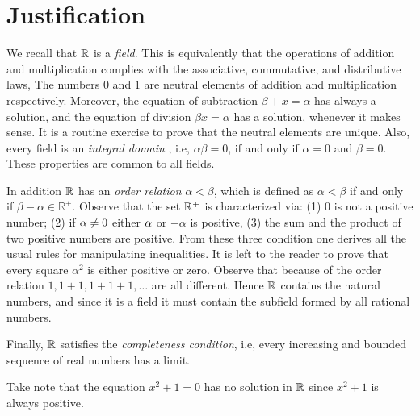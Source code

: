  
 
 \section{Justification}
 We recall that $ \mathbb{R} $ is a \emph{field}. This is equivalently that the operations of addition and multiplication complies with the associative, commutative, and distributive laws, The numbers $0$ and $1$ are neutral elements of addition and multiplication respectively. Moreover, the equation of subtraction $ \beta + x = \alpha $ has always a solution, and the equation of division $ \beta x = \alpha $ has a solution, whenever it makes sense. It is a routine exercise to prove that the neutral elements are unique. Also, every field is an \emph{integral domain }, i.e, $ \alpha \beta = 0 $, if and only if $ \alpha = 0$ and $ \beta = 0 $. These properties are common to all fields.
 
 In addition $\mathbb{R}$ has an \emph{order relation} $ \alpha < \beta $, which is defined as $ \alpha < \beta $ if and only if $ \beta - \alpha \in \mathbb{R}^+ $. Observe that the set $ \mathbb{R}^+ $ is characterized via: (1) 0 is not a positive number; (2) if $ \alpha \neq 0 $ either $ \alpha $ or $ -\alpha $ is positive, (3) the sum and the product of two positive numbers are positive. From these three condition one derives all the usual rules for manipulating inequalities. It is left to the reader to prove that every square $ \alpha^2 $ is either positive or zero. Observe that because of the order relation $1, 1+1, 1+1+1, \ldots $ are all different. Hence $ \mathbb{R} $ contains the natural numbers, and since it is a field it must contain the subfield formed by all rational numbers.
 
 Finally, $ \mathbb{R}$ satisfies the \emph{completeness condition}, i.e, every increasing and bounded sequence of real numbers has a limit.
 
 Take note that the equation $ x^2 + 1 =0 $ has no solution in $ \mathbb{R} $ since $ x^2 + 1 $ is always positive. 
 



